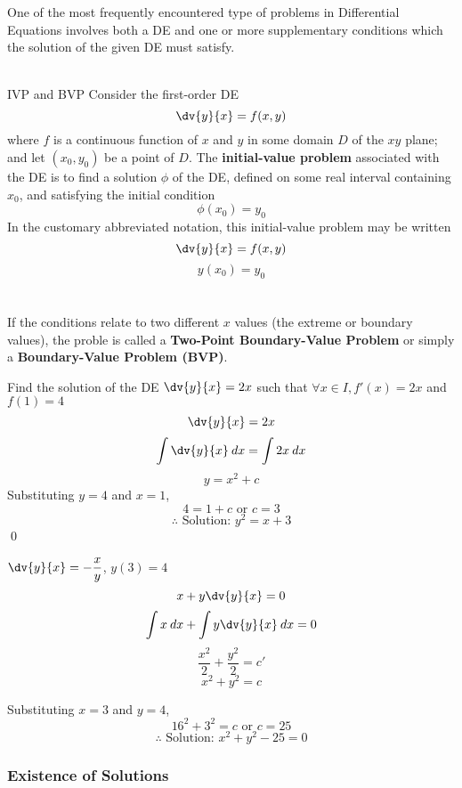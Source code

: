 One of the most frequently encountered type of problems in Differential Equations involves both a DE and one or more supplementary conditions which the solution of the given DE must satisfy. \\~\\

\begin{definition}{IVP and BVP}{}
    Consider the first-order DE \[
        \dv{y}{x} = f(x,y)
    \] where $f$ is a continuous function of $x$ and $y$ in some domain $D$ of the $xy$ plane; and let $(x_0,y_0)$ be a point of $D$. The \textbf{initial-value problem} associated with the DE is to find a solution $\phi$ of the DE, defined on some real interval containing $x_0$, and satisfying the initial condition \[
        \phi(x_0) = y_0
    \] In the customary abbreviated notation, this initial-value problem may be written \[
        \dv{y}{x} = f(x,y)
    \] \[
        y(x_0) = y_0
    \] \\~\\

    If the conditions relate to two different $x$ values (the extreme or boundary values), the proble is called a \textbf{Two-Point Boundary-Value Problem} or simply a \textbf{Boundary-Value Problem (BVP)}.
\end{definition}

\begin{example}{Find the solution of the DE $\dv{y}{x} = 2x$ such that $\forall x\in I, f'(x) = 2x$ and  $f(1)=4$}{}
    \[ \dv{y}{x} = 2x \]
    \[ \int {\dv{y}{x}} \: d{x} = \int {2x} \: d{x} \]
    \[ y = x^2 + c \]
    Substituting $y=4$ and $x=1$,
    \[ 4 = 1 + c \text{ or } c = 3 \]
    \[ \therefore \text{ Solution: } y^2 = x + 3 \] \qed
\end{example}

\begin{example}{$\dv{y}{x} = -\dfrac{x}{y}$, $y(3)=4$}{}
    \[ x + y \dv{y}{x} = 0 \]
    \[ \int{x} \: d{x} + \int{y \dv{y}{x}} \: d{x} = 0 \]
    \[ \frac{x^2}{2} + \frac{y^2}{2} = c' \]
    \[ x^2 + y^2 = c \]

    Substituting $x=3$ and $y=4$,
    \[ 16^2 + 3^2 = c \text{ or } c = 25 \]
    \[ \therefore \text{ Solution: } x^2 + y^2 - 25 = 0 \]
\end{example}

\vspace{20pt}
\subsubsection{Existence of Solutions}

